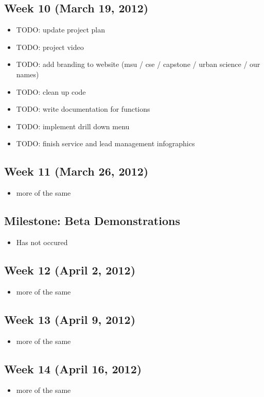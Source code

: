\documentclass[11pt,a4paper,oneside]{article}
\begin{document}
\subsection{Week 10 (March 19, 2012)}
\begin{itemize}
\item TODO: update project plan
\item TODO: project video
\item TODO: add branding to website (msu / cse / capstone / urban science / our names)
\item TODO: clean up code
\item TODO: write documentation for functions
\item TODO: implement drill down menu
\item TODO: finish service and lead management infographics
\end{itemize}

\subsection{Week 11 (March 26, 2012)}
\begin{itemize}
\item more of the same
\end{itemize}

\subsection{Milestone: Beta Demonstrations}
\begin{itemize}
\item Has not occured
\end{itemize}

\subsection{Week 12 (April 2, 2012)}
\begin{itemize}
\item more of the same
\end{itemize}

\subsection{Week 13 (April 9, 2012)}
\begin{itemize}
\item more of the same
\end{itemize}

\subsection{Week 14 (April 16, 2012)}
\begin{itemize}
\item more of the same
\end{itemize}
\end{document}
